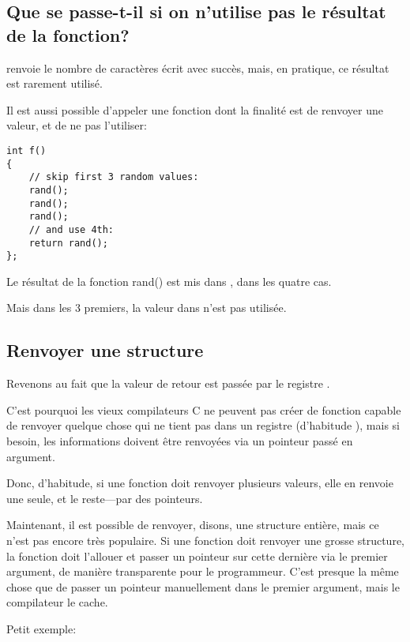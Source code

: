 \subsection{Que se passe-t-il si on n'utilise pas le résultat de la fonction?}

\printf renvoie le nombre de caractères écrit avec succès, mais, en pratique, ce
résultat est rarement utilisé.

Il est aussi possible d'appeler une fonction dont la finalité est de renvoyer une valeur,
et de ne pas l'utiliser:

\begin{lstlisting}[style=customc]
int f()
{
    // skip first 3 random values:
    rand();
    rand();
    rand();
    // and use 4th:
    return rand();
};
\end{lstlisting}

Le résultat de la fonction rand() est mis dans \EAX, dans les quatre cas.

Mais dans les 3 premiers, la valeur dans \EAX n'est pas utilisée.

\subsection{Renvoyer une structure}


Revenons au fait que la valeur de retour est passée par le registre \EAX.

C'est pourquoi les vieux compilateurs C ne peuvent pas créer de fonction capable
de renvoyer quelque chose qui ne tient pas dans un registre (d'habitude \Tint), mais
si besoin, les informations doivent être renvoyées via un pointeur passé en argument.

Donc, d'habitude, si une fonction doit renvoyer plusieurs valeurs, elle en renvoie
une seule, et le reste---par des pointeurs.

Maintenant, il est possible de renvoyer, disons, une structure entière, mais ce
n'est pas encore très populaire.
Si une fonction doit renvoyer une grosse structure, la fonction 
doit l'allouer et passer un pointeur sur cette dernière via le premier argument,
de manière transparente pour le programmeur.
C'est presque la même chose que de passer un pointeur manuellement dans le premier
argument, mais le compilateur le cache.

Petit exemple:



